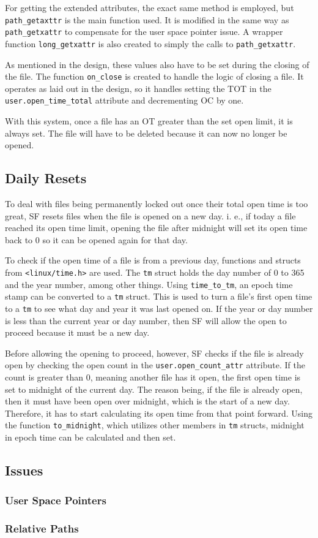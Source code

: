 For getting the extended attributes, the exact same method is employed, but \texttt{path\_getaxttr} is the main function used. It is modified in the same way as \texttt{path\_getxattr} to compensate for the user space pointer issue. A wrapper function \texttt{long\_getxattr} is also created to simply the calls to \texttt{path\_getxattr}.

As mentioned in the design, these values also have to be set during the closing of the file. The function \texttt{on\_close} is created to handle the logic of closing a file. It operates as laid out in the design, so it handles setting the TOT in the \texttt{user.open\_time\_total} attribute and decrementing OC by one.

With this system, once a file has an OT greater than the set open limit, it is always set. The file will have to be deleted because it can now no longer be opened.

\subsection{Daily Resets}

To deal with files being permanently locked out once their total open time is too great, SF resets files when the file is opened on a new day. i. e., if today a file reached its open time limit, opening the file after midnight will set its open time back to 0 so it can be opened again for that day.

To check if the open time of a file is from a previous day, functions and structs from \texttt{<linux/time.h>} are used. The \texttt{tm} struct holds the day number of 0 to 365 and the year number, among other things. Using \texttt{time\_to\_tm}, an epoch time stamp can be converted to a \texttt{tm} struct. This is used to turn a file's first open time to a \texttt{tm} to see what day and year it was last opened on. If the year or day number is less than the current year or day number, then SF will allow the open to proceed because it must be a new day.

Before allowing the opening to proceed, however, SF checks if the file is already open by checking the open count in the \texttt{user.open\_count\_attr} attribute. If the count is greater than 0, meaning another file has it open, the first open time is set to midnight of the current day. The reason being, if the file is already open, then it must have been open over midnight, which is the start of a new day. Therefore, it has to start calculating its open time from that point forward. Using the function \texttt{to\_midnight}, which utilizes other members in \texttt{tm} structs, midnight in epoch time can be calculated and then set.

\subsection{Issues}
\subsubsection*{User Space Pointers}

\subsubsection*{Relative Paths}